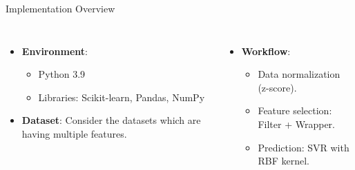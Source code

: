 \documentclass{beamer}
\begin{document}
\begin{frame}{Implementation Overview}
    \begin{columns}[T]
        \begin{itemize}
            \item \textbf{Environment}:
                \begin{itemize}
                    \item Python 3.9
                    \item Libraries: Scikit-learn, Pandas, NumPy
                \end{itemize}
            \item \textbf{Dataset}: Consider the datasets which are having multiple features.
        \end{itemize}
        \begin{itemize}
            \item \textbf{Workflow}:
                \begin{itemize}
                    \item Data normalization (z-score).
                    \item Feature selection: Filter + Wrapper.
                    \item Prediction: SVR with RBF kernel.
                \end{itemize}
        \end{itemize}
    \end{columns}
\end{frame}
\end{document}
